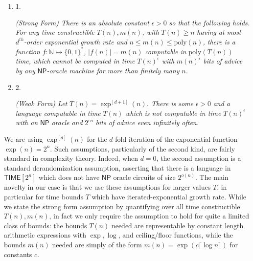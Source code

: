 \begin{enumerate}


\item[] 
1. 


\emph{(Strong Form) There is an absolute constant }$\epsilon>0$\emph{ so that the following holds. For any time constructible }$T(n),m(n)$\emph{, with }$T(n)\geq n$\emph{ having at most }$d^{th}$\emph{-order exponential growth rate and }$n\leq m(n)\leq\mathrm{poly}(n)$\emph{, there is a function }$f:\mathbb{N}\mapsto\{0,1\}^{*}$\emph{, }$|f(n)|=m(n)$\emph{ computable in }$\mathrm{poly}(T(n))$\emph{ time, which cannot be computed in time }$T(n)^{\epsilon}$\emph{ with }$m(n)^{\epsilon}$\emph{ bits of advice by any }${\mathsf{NP}}$\emph{-oracle machine for more than finitely many }$n$\emph{.}\par





\item[] 
2. 


\emph{(Weak Form) Let }$T(n)=\exp^{[d+1]}(n)$\emph{. There is some }$\epsilon>0$\emph{ and a language computable in time }$T(n)$\emph{ which is not computable in time }$T(n)^{\epsilon}$\emph{ with an }${\mathsf{NP}}$\emph{ oracle and }$2^{\epsilon n}$\emph{ bits of advice even infinitely often.}\par





\end{enumerate}






We are using $\exp^{[d]}(n)$ for the $d$-fold iteration of the exponential function $\exp(n)=2^{n}$. Such assumptions, particularly of the second kind, are fairly standard in complexity theory. Indeed, when $d=0$, the second assumption is a standard derandomization assumption, asserting that there is a language in ${\mathsf{TIME}}[2^{n}]$ which does not have ${\mathsf{NP}}$ oracle circuits of size $2^{o(n)}$. The main novelty in our case is that we use these assumptions for larger values $T$, in particular for time bounds $T$ which have iterated-exponential growth rate. While we state the strong form assumption by quantifying over all time constructible $T(n),m(n)$, in fact we only require the assumption to hold for quite a limited class of bounds: the bounds $T(n)$ needed are representable by constant length arithmetic expressions with $\exp,\log$, and ceiling/floor functions, while the bounds $m(n)$ needed are simply of the form $m(n)=\exp(c\lceil\log n\rceil)$ for constants $c$.\par




